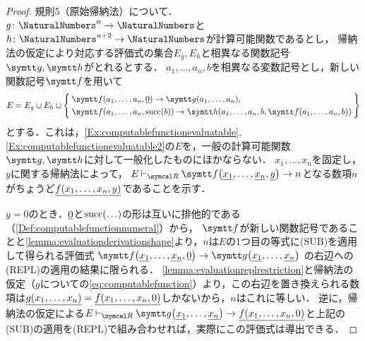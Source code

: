 \begin{proof}
	規則5（原始帰納法）について．\(g \colon \NaturalNumbers^n \to \NaturalNumbers\)と\(h \colon \NaturalNumbers^{n+2} \to \NaturalNumbers\)が計算可能関数であるとし，
	帰納法の仮定により対応する評価式の集合\(E_g, E_h\)と相異なる関数記号\(\obj{g}, \obj{h}\)がとれるとする．
	\(a_1, \dots, a_n, b\)を相異なる変数記号とし，新しい関数記号\(\obj{f}\)を用いて
	\begin{align*}
		E = E_g \cup E_h \cup \Set{
			\begin{aligned}
				 & \apply{\obj{f}}{a_1, \dots, a_n, \numeral{0}} \evaluate \apply{\obj{g}}{a_1, \dots, a_n},                                                 \\
				 & \apply{\obj{f}}{a_1, \dots, a_n, \apply{\succfunc}{b}} \evaluate \apply{\obj{h}}{a_1, \dots, a_n, b, \apply{\obj{f}}{a_1, \dots, a_n, b}}
			\end{aligned}
		}
	\end{align*}
	とする．これは，\cref{Ex:computablefunctionevaluatable}, \cref{Ex:computablefunctionevaluatable2}の\(E\)を，一般の計算可能関数\(\obj{g}, \obj{h}\)に対して一般化したものにほかならない．
	\(x_1, \dots, x_n\)を固定し，\(y\)に関する帰納法によって，
	\(E \evaluatable \apply{\obj{f}}{\numeral{x_1}, \dots, \numeral{x_n}, \numeral{y}} \evaluate n\)となる数項\(n\)がちょうど\(\numeral{\apply{f}{x_1, \dots, x_n, y}}\)であることを示す．

	\(y = 0\)のとき．\(\underline{0}\)と\(\apply{\succfunc}{\dots}\)の形は互いに排他的である（\cref{Def:computablefunctionnumeral}）から，
	\(\obj{f}\)が新しい関数記号であることと\cref{lemma:evaluationderivationshape}より，\(n\)は\(E\)の1つ目の等式に(SUB)を適用して得られる評価式
	\(\apply{\obj{f}}{\numeral{x_1}, \dots, \numeral{x_n}, \numeral{0}} \evaluate \apply{\obj{g}}{\numeral{x_1}, \dots, \numeral{x_n}}\)
	の右辺への(REPL)の適用の結果に限られる．
	\cref{lemma:evaluationreplrestriction}と帰納法の仮定（\(g\)についての\cref{eq:computablefunction}）より，この右辺を置き換えられる数項は\(\numeral{\apply{g}{x_1, \dots, x_n}} = \numeral{\apply{f}{x_1, \dots, x_n, 0}}\)しかないから，\(n\)はこれに等しい．
	逆に，帰納法の仮定による\(E \evaluatable \apply{\obj{g}}{\numeral{x_1}, \dots, \numeral{x_n}} \evaluate \numeral{\apply{f}{x_1, \dots, x_n, 0}}\)と上記の(SUB)の適用を(REPL)で組み合わせれば，実際にこの評価式は導出できる．


\end{proof}
